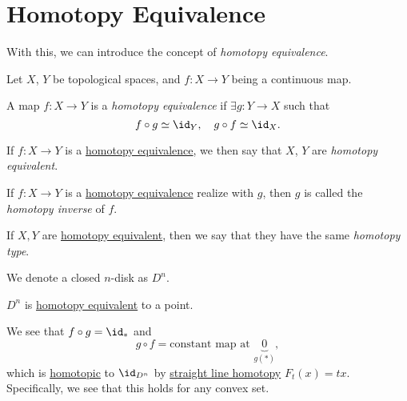 \section{Homotopy Equivalence}
With this, we can introduce the concept of \emph{homotopy equivalence}.
\begin{definition*}
	Let \(X\), \(Y\) be topological spaces, and \(f\colon X\to Y\) being a continuous map.
	\begin{definition}\label{def:homotopy-equivalence}
		A map \(f\colon X\to Y\) is a \emph{homotopy equivalence} if \(\exists g\colon Y\to X\) such that
		\[
			f\circ g \simeq \id_Y, \quad g\circ f \simeq \id_X.
		\]
		\begin{center}
		\end{center}
	\end{definition}

	\begin{definition}\label{def:homotopy-equivalent}
		If \(f\colon X\to Y\) is a \hyperref[def:homotopy-equivalence]{homotopy equivalence}, we then say that \(X\), \(Y\) are \emph{homotopy equivalent}.
	\end{definition}

	\begin{definition}\label{def:homotopy-inverse}
		If \(f\colon X\to Y\) is a \hyperref[def:homotopy-equivalence]{homotopy equivalence} realize with \(g\), then \(g\) is called the \emph{homotopy inverse} of \(f\).
	\end{definition}

	\begin{definition}\label{def:homotopy-type}
		If \(X, Y\) are \hyperref[def:homotopy-equivalence]{homotopy equivalent}, then we say that they have the
		same \emph{homotopy type}.
	\end{definition}

\end{definition*}

\begin{notation}
	We denote a closed \(n\)-disk as \(D^n\).
\end{notation}
\begin{eg}
	\(D^n\) is \hyperref[def:homotopy-equivalence]{homotopy equivalent} to a point.
	\begin{center}
	\end{center}
\end{eg}
\begin{explanation}
	We see that \(f\circ g = \id_\ast\) and
	\[
		g\circ f = \text{constant map at }\underbrace{0}_{g(\ast)},
	\]
	which is \hyperref[def:homotopic]{homotopic} to \(\id_{D^n}\) by
	\hyperref[eg:lec1:straight-line-homotopy]{straight line homotopy} \(F_t(x) = tx\). Specifically, we see that this holds for any convex set.
\end{explanation}

